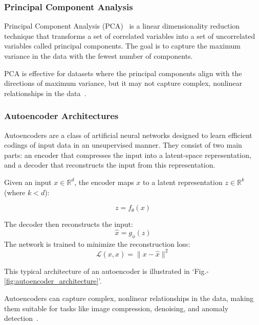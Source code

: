 \documentclass[conference]{IEEEtran}
\begin{document}
\subsubsection{Principal Component Analysis}
Principal Component Analysis (PCA)~\cite{shlensTutorialPrincipalComponent2014} is a linear dimensionality 
reduction technique that transforms a set of correlated 
variables into a set of uncorrelated variables called 
principal components. The goal is to capture the maximum 
variance in the data with the fewest number of components.

PCA is effective for datasets where the principal components 
align with the directions of maximum variance, but it may not 
capture complex, nonlinear relationships in the data~\cite{jolliffePrincipalComponentAnalysis2016}.

\subsubsection{Autoencoder Architectures}
Autoencoders are a class of artificial neural networks 
designed to learn efficient codings of input data in an 
unsupervised manner. They consist of two main parts: an 
encoder that compresses the input into a latent-space 
representation, and a decoder that reconstructs the input 
from this representation.

Given an input \( x \in \mathbb{R}^d \), the encoder maps 
\( x \) to a latent representation \( z \in \mathbb{R}^k \) 
(where \( k < d \)):

\begin{equation}
    z = f_\theta(x)
\end{equation}

The decoder then reconstructs the input:
\begin{equation}
    \hat{x} = g_\phi(z)
\end{equation}
The network is trained to minimize the reconstruction loss:
\begin{equation}
    \mathcal{L}(x, \hat{x}) = \| x - \hat{x} \|^2
\end{equation}

This typical architecture of an autoencoder is illustrated in 
`Fig.-\ref{fig:autoencoder_architecture}'.




Autoencoders can capture complex, nonlinear 
relationships in the data, making them suitable for tasks 
like image compression, denoising, and anomaly 
detection~\cite{hintonReducingDimensionalityData2006, estevaGuideDeepLearning2019a}.
\end{document}
